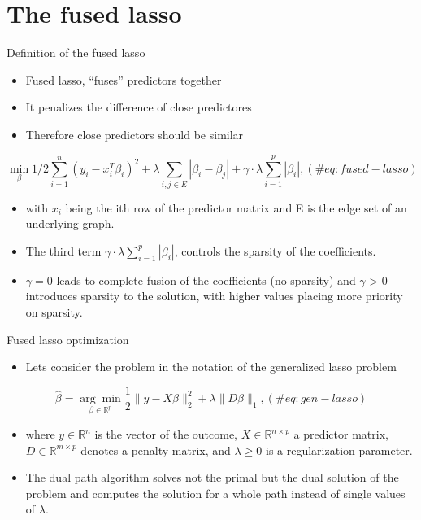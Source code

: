 \documentclass[
  ignorenonframetext,
]{beamer}
\providecommand{\tightlist}{%
  \setlength{\itemsep}{0pt}\setlength{\parskip}{0pt}}
\begin{document}
\hypertarget{the-fused-lasso}{%
\section{The fused lasso}\label{the-fused-lasso}}

\begin{frame}{Definition of the fused lasso}
\protect\hypertarget{definition-of-the-fused-lasso}{}
\begin{itemize}
\tightlist
\item
  Fused lasso, ``fuses'' predictors together
\item
  It penalizes the difference of close predictores
\item
  Therefore close predictors should be similar
\end{itemize}

\begin{equation}
\min_{\beta} 1/2 \sum_{i=1}^n(y_i - x_i^T\beta_i)^2 + \lambda \sum_{i,j \in E} |\beta_i - \beta_j| + \gamma \cdot \lambda \sum_{i=1}^p|\beta_i|,
(\#eq:fused-lasso)
\end{equation}

\begin{itemize}
\tightlist
\item
  with \(x_i\) being the ith row of the predictor matrix and E is the
  edge set of an underlying graph.
\item
  The third term \(\gamma \cdot \lambda \sum_{i=1}^p|\beta_i|\),
  controls the sparsity of the coefficients.
\item
  \(\gamma=0\) leads to complete fusion of the coefficients (no
  sparsity) and \(\gamma\) \textgreater{} 0 introduces sparsity to the
  solution, with higher values placing more priority on sparsity.
\end{itemize}
\end{frame}

\begin{frame}{Fused lasso optimization}
\protect\hypertarget{fused-lasso-optimization}{}
\begin{itemize}
\tightlist
\item
  Lets consider the problem in the notation of the generalized lasso
  problem
\end{itemize}

\begin{equation}
\hat{\beta}=\underset{\beta \in \mathbb{R}^{p}}{\arg \min } \frac{1}{2}\|y-X \beta\|_{2}^{2}+\lambda\|D \beta\|_{1},
(\#eq:gen-lasso)
\end{equation}

\begin{itemize}
\tightlist
\item
  where \(y \in \mathbb{R}^n\) is the vector of the outcome,
  \(X \in \mathbb{R}^{n \times p}\) a predictor matrix,
  \(D \in \mathbb{R}^{m \times p}\) denotes a penalty matrix, and
  \(\lambda \geq 0\) is a regularization parameter.
\item
  The dual path algorithm solves not the primal but the dual solution of
  the problem and computes the solution for a whole path instead of
  single values of \(\lambda\).
\end{itemize}
\end{frame}
\end{document}
